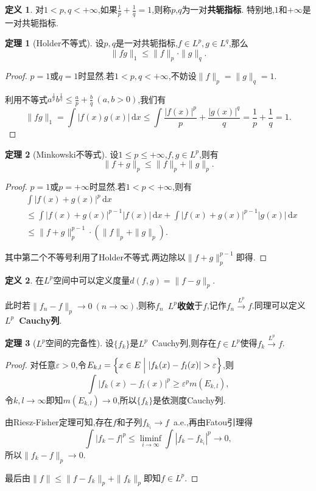 \documentclass{ctexart}
\theoremstyle{definition}
\newtheorem{definition}{定义}
\newtheorem{theorem}{定理}
\theoremstyle{remark}
\begin{document}
	\begin{definition}
		对$1<p,q<+\infty$,如果$\frac{1}{p}+\frac{1}{q}=1$,则称$p$,$q$为一对\textbf{共轭指标}.
		特别地,$1$和$+\infty$是一对共轭指标.
	\end{definition}
	\begin{theorem}[Holder不等式]
		设$p,q$是一对共轭指标,$f\in L^p,g\in L^q$,那么
		$$\|fg\|_1\le\|f\|_p\cdot\|g\|_q.$$
	\end{theorem}
	\begin{proof}
		$p=1$或$q=1$时显然.若$1<p,q<+\infty$,不妨设$\|f\|_p=\|g\|_q=1$.
		
		利用不等式$a^\frac{1}{p}b^\frac{1}{q}\le\frac{a}{p}+\frac{b}{q}\ (a,b>0)$,我们有
		$$\|fg\|_1=\int{|f(x)g(x)|\,\mathrm{d}x}\le\int{\frac{|f(x)|^p}{p}+\frac{|g(x)|^q}{q}}=\frac{1}{p}+\frac{1}{q}=1.$$
	\end{proof}
	\begin{theorem}[Minkowski不等式]
		设$1\le p\le+\infty$,$f,g\in L^p$,则有
		$$\|f+g\|_p\le\|f\|_p+\|g\|_p.$$
	\end{theorem}
	\begin{proof}
		$p=1$或$p=+\infty$时显然.若$1<p<+\infty$,则有
		\begin{align*}
			& \int{|f(x)+g(x)|^p\,\mathrm{d}x} \\
			& \le \int{|f(x)+g(x)|^{p-1}|f(x)|\,\mathrm{d}x}+\int{|f(x)+g(x)|^{p-1}|g(x)|\,\mathrm{d}x} \\
			& \le \|f+g\|_p^{p-1}\cdot(\|f\|_p+\|g\|_p).
		\end{align*}
		
		其中第二个不等号利用了Holder不等式.两边除以$\|f+g\|_p^{p-1}$即得.
	\end{proof}
	
	\begin{definition}
		在$L^p$空间中可以定义度量$d(f,g)=\|f-g\|_p$.
		
		此时若$\|f_n-f\|_p\to 0\ (n\to\infty)$,则称$f_n$\ \textbf{$L^p$收敛}于$f$,记作$f_n\xrightarrow{L^p}f$.同理可以定义\textbf{$L^p$\ Cauchy列}.
	\end{definition}
	\begin{theorem}[$L^p$空间的完备性]
		设$\{f_k\}$是$L^p$\ Cauchy列,则存在$f\in L^p$使得$f_k\xrightarrow{L^p}f$.
	\end{theorem}
	\begin{proof}
		对任意$\varepsilon>0$,令$E_{k,l}=\Bigl\{x\in E\Bigm||f_k(x)-f_l(x)|>\varepsilon\Bigr\}$,则
		$$\int{|f_k(x)-f_l(x)|^p}\ge\varepsilon^pm(E_{k,l}),$$
		令$k,l\to\infty$即知$m(E_{k,l})\to0$,所以$\{f_k\}$是依测度Cauchy列.
		
		由Riesz-Fisher定理可知,存在$f$和子列$f_{k_i}\to f$\ a.e.,再由Fatou引理得
		$$\int{|f_k-f|^p}\le\liminf_{i\to\infty}{\int{|f_k-f_{k_i}|^p}}\to0,$$
		所以$\|f_k-f\|_p\to0$.
		
		最后由$\|f\|\le\|f-f_k\|_p+\|f_k\|_p$即知$f\in L^p$.
	\end{proof}
	
\end{document}

